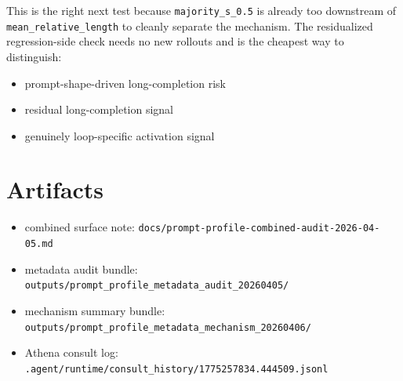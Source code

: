\documentclass[11pt]{article}
\begin{document}
This is the right next test because \texttt{majority\_s\_0.5} is already too downstream of \texttt{mean\_relative\_length} to cleanly separate the mechanism. The residualized regression-side check needs no new rollouts and is the cheapest way to distinguish:
\begin{itemize}[leftmargin=1.5em]
\item prompt-shape-driven long-completion risk
\item residual long-completion signal
\item genuinely loop-specific activation signal
\end{itemize}

\section*{Artifacts}
\begin{itemize}[leftmargin=1.5em]
\item combined surface note: \texttt{docs/prompt-profile-combined-audit-2026-04-05.md}
\item metadata audit bundle: \texttt{outputs/prompt\_profile\_metadata\_audit\_20260405/}
\item mechanism summary bundle: \texttt{outputs/prompt\_profile\_metadata\_mechanism\_20260406/}
\item Athena consult log: \texttt{.agent/runtime/consult\_history/1775257834.444509.jsonl}
\end{itemize}
\end{document}
